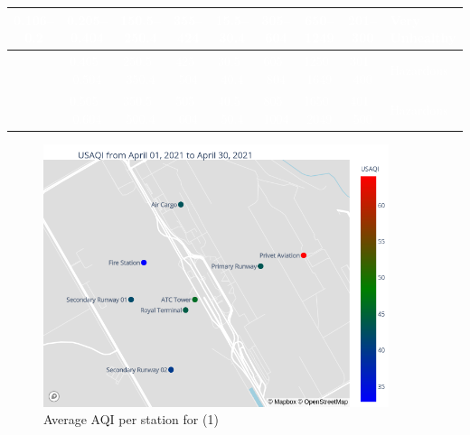 \documentclass[12pt, oneside]{book}
\begin{document}
\begin{table}[H]
{\begin{tabular}{*{8}{|c}|p{2.8cm}|}
\textcolor{white}{0.106--0.2} & \textcolor{white}{0.205--0.404} & \textcolor{white}{150.5--250.4} & \textcolor{white}{355--424} & \textcolor{white}{15.5--30.4} & \textcolor{white}{305--604} & \textcolor{white}{650--1249} & \textcolor{white}{201--300} & \textcolor{white}{Very Unhealthy} \rule[-0.9\baselineskip]{0pt}{2.2\baselineskip}\\ \hline
{} & \textcolor{white}{0.405--0.504} & \textcolor{white}{250.5--350.4} & \textcolor{white}{425--504} & \textcolor{white}{30.5--40.4} & \textcolor{white}{605--804} & \textcolor{white}{1250--1649} & \textcolor{white}{301--400} & \textcolor{white}{Hazardous} \rule[-0.9\baselineskip]{0pt}{2.2\baselineskip}\\ \hline
{} & \textcolor{white}{0.505--0.604} & \textcolor{white}{350.5--500.4} & \textcolor{white}{505--604} & \textcolor{white}{40.5--50.4} & \textcolor{white}{805--1004} & \textcolor{white}{1650--2049} & \textcolor{white}{401--500} & \textcolor{white}{Hazardous} \rule[-0.9\baselineskip]{0pt}{2.2\baselineskip}\\ \hline
\end{tabular}
}
\end{table}
{\begin{figure}[H]
\centering
\includegraphics[width=0.90\textwidth]{image22}
\caption{Average AQI per station for \monthyear (1)}\label{image22}
\end{figure}}
\end{document}
